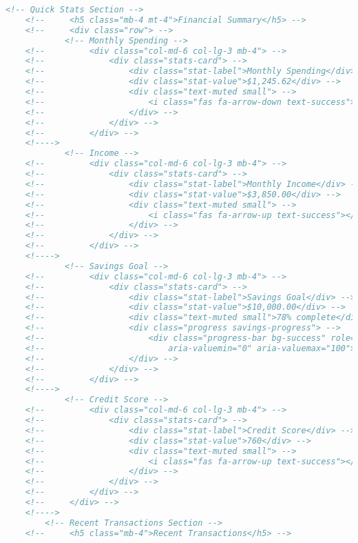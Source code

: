 \begin{lstlisting}[language=HTML]
        <!-- Quick Stats Section -->
    <!--     <h5 class="mb-4 mt-4">Financial Summary</h5> -->
    <!--     <div class="row"> -->
            <!-- Monthly Spending -->
    <!--         <div class="col-md-6 col-lg-3 mb-4"> -->
    <!--             <div class="stats-card"> -->
    <!--                 <div class="stat-label">Monthly Spending</div> -->
    <!--                 <div class="stat-value">$1,245.62</div> -->
    <!--                 <div class="text-muted small"> -->
    <!--                     <i class="fas fa-arrow-down text-success"></i> 12% from last month -->
    <!--                 </div> -->
    <!--             </div> -->
    <!--         </div> -->
    <!---->
            <!-- Income -->
    <!--         <div class="col-md-6 col-lg-3 mb-4"> -->
    <!--             <div class="stats-card"> -->
    <!--                 <div class="stat-label">Monthly Income</div> -->
    <!--                 <div class="stat-value">$3,850.00</div> -->
    <!--                 <div class="text-muted small"> -->
    <!--                     <i class="fas fa-arrow-up text-success"></i> 5% from last month -->
    <!--                 </div> -->
    <!--             </div> -->
    <!--         </div> -->
    <!---->
            <!-- Savings Goal -->
    <!--         <div class="col-md-6 col-lg-3 mb-4"> -->
    <!--             <div class="stats-card"> -->
    <!--                 <div class="stat-label">Savings Goal</div> -->
    <!--                 <div class="stat-value">$10,000.00</div> -->
    <!--                 <div class="text-muted small">78% complete</div> -->
    <!--                 <div class="progress savings-progress"> -->
    <!--                     <div class="progress-bar bg-success" role="progressbar" style="width: 78%" aria-valuenow="78" -->
    <!--                         aria-valuemin="0" aria-valuemax="100"></div> -->
    <!--                 </div> -->
    <!--             </div> -->
    <!--         </div> -->
    <!---->
            <!-- Credit Score -->
    <!--         <div class="col-md-6 col-lg-3 mb-4"> -->
    <!--             <div class="stats-card"> -->
    <!--                 <div class="stat-label">Credit Score</div> -->
    <!--                 <div class="stat-value">760</div> -->
    <!--                 <div class="text-muted small"> -->
    <!--                     <i class="fas fa-arrow-up text-success"></i> Excellent -->
    <!--                 </div> -->
    <!--             </div> -->
    <!--         </div> -->
    <!--     </div> -->
    <!---->
        <!-- Recent Transactions Section -->
    <!--     <h5 class="mb-4">Recent Transactions</h5> -->

\end{lstlisting}
